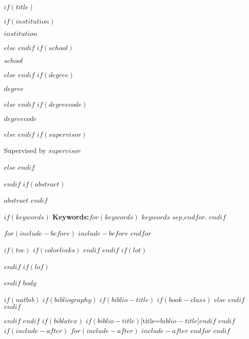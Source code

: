 \documentclass[$if(fontsize)$$fontsize$,$endif$$if(lang)$$babel-lang$,$endif$$if(papersize)$$papersize$paper,$endif$$for(classoption)$$classoption$$sep$,$endfor$]{$documentclass$}
\makeatletter
\renewcommand\maketitle{%
    \begin{titlepage}
      \centering
      $if(institution)$
        {\scshape\Large $institution$ \par}
      $else$
        \null
      $endif$
      \vspace{0.25cm}
      $if(school)$
        {\scshape\large $school$ \par}
      $else$
        \null
      $endif$
      \vspace{1cm}
      $if(degree)$
        {\bfseries\large $degree$ \par}
      $else$
        \null
      $endif$
      \vspace{1.5cm}
      $if(degreecode)$
        {\itshape\large $degreecode$ \par}
      $else$
        \null
      $endif$
      \vspace{2cm}
      \null
      \vfill
      \null
      \vfill
      \null
      \vspace{0.25cm}
      $if(supervisor)$
        { Supervised by $supervisor$ \par}
      $else$
        \null
      $endif$
      \vfill
    \end{titlepage}
  }
\renewenvironment{abstract}{%
    \clearpage\small
    \null\vfil
    \begin{center}%
        {\bfseries \abstractname\vspace{-.5em}\vspace{0pt}}%
    \end{center}%
    \quotation
}
\makeatother
\begin{document}
  $if(title)$
    \maketitle
  $endif$
  $if(abstract)$
    \begin{abstract}
      $abstract$
    \end{abstract}
  $endif$

  $if(keywords)$
    \vfill
    \textbf{Keywords:}$for(keywords)$ $keywords$ $sep$,$endfor$.
  $endif$

  $for(include-before)$
    $include-before$
  $endfor$

  $if(toc)${
    $if(colorlinks)$
      \hypersetup{linkcolor=$if(toccolor)$$toccolor$$else$black$endif$}
    $endif$
    \setcounter{tocdepth}{$toc-depth$}
    \tableofcontents
  }
  $endif$
  $if(lot)$
    \listoftables
  $endif$
  $if(lof)$
    \listoffigures
  $endif$
  $body$

  $if(natbib)$
  $if(bibliography)$
  $if(biblio-title)$
  $if(book-class)$
    \renewcommand\bibname{$biblio-title$}
  $else$
    \renewcommand\refname{$biblio-title$}
  $endif$
  $endif$
  

  $endif$
  $endif$
  $if(biblatex)$
    \printbibliography$if(biblio-title)$[title=$biblio-title$]$endif$
  $endif$
  $if(include-after)$
    \appendix
    $for(include-after)$
      $include-after$
    $endfor$
  $endif$
\end{document}
